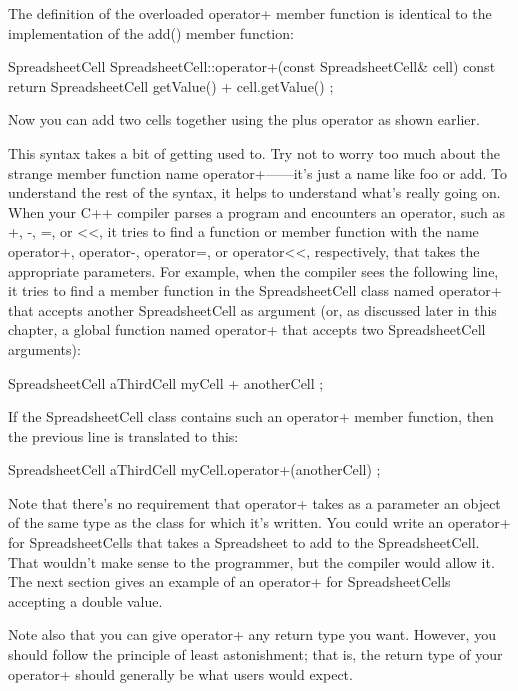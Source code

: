 The definition of the overloaded operator+ member function is identical to the implementation of the add() member function:

\begin{cpp}
SpreadsheetCell SpreadsheetCell::operator+(const SpreadsheetCell& cell) const
{
    return SpreadsheetCell { getValue() + cell.getValue() };
}
\end{cpp}

Now you can add two cells together using the plus operator as shown earlier.

This syntax takes a bit of getting used to. Try not to worry too much about the strange member function name operator+——it’s just a name like foo or add. To understand the rest of the syntax, it helps to understand what’s really going on. When your C++ compiler parses a program and encounters an operator, such as +, -, =, or <{}<, it tries to find a function or member function with the name operator+, operator-, operator=, or operator<{}<, respectively, that takes the appropriate parameters. For example, when the compiler sees the following line, it tries to find a member function in the SpreadsheetCell class named operator+ that accepts another SpreadsheetCell as argument (or, as discussed later in this chapter, a global function named operator+ that accepts two SpreadsheetCell arguments):

\begin{cpp}
SpreadsheetCell aThirdCell { myCell + anotherCell };
\end{cpp}

If the SpreadsheetCell class contains such an operator+ member function, then the previous line is translated to this:

\begin{cpp}
SpreadsheetCell aThirdCell { myCell.operator+(anotherCell) };
\end{cpp}

Note that there’s no requirement that operator+ takes as a parameter an object of the same type as the class for which it’s written. You could write an operator+ for SpreadsheetCells that takes a Spreadsheet to add to the SpreadsheetCell. That wouldn’t make sense to the programmer, but the compiler would allow it. The next section gives an example of an operator+ for SpreadsheetCells accepting a double value.

Note also that you can give operator+ any return type you want. However, you should follow the principle of least astonishment; that is, the return type of your operator+ should generally be what users would expect.

